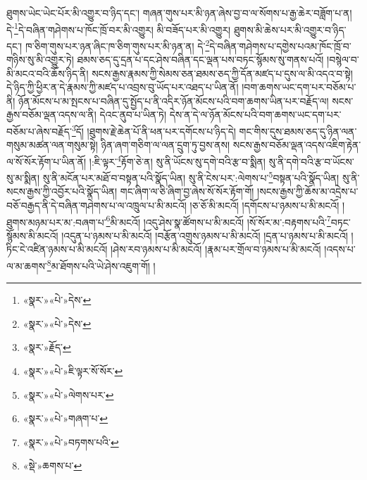 ཐུགས་ཡེང་ཡེང་པོར་མི་འགྱུར་བ་ཉིད་དང་། གཞན་གུས་པར་མི་ཉན་ཞེས་བྱ་བ་ལ་སོགས་པ་རྒྱ་ཆེར་བཟློག་པ་ན། དེ་\footnote{«སྣར་»«པེ་»དེས་}དེ་བཞིན་གཤེགས་པ་ཁོང་ཁྲོ་བར་མི་འགྱུར། མི་བཟོད་པར་མི་འགྱུར། ཐུགས་མི་ཆེས་པར་མི་འགྱུར་བ་ཉིད་དང་། ཁ་ཅིག་གུས་པར་ཉན་ཞིང་ཁ་ཅིག་གུས་པར་མི་ཉན་ན། དེ་\footnote{«སྣར་»«པེ་»དེས་}དེ་བཞིན་གཤེགས་པ་དགྱེས་པའམ་ཁོང་ཁྲོ་བ་གཉིས་སུ་མི་འགྱུར་ཏེ། ཐམས་ཅད་དུ་དྲན་པ་དང་ཤེས་བཞིན་དང་ལྡན་པས་བཏང་སྙོམས་སུ་གནས་པའོ། །བསྙེལ་བ་མི་མངའ་བའི་ཆོས་ཉིད་ནི། སངས་རྒྱས་རྣམས་ཀྱི་སེམས་ཅན་ཐམས་ཅད་ཀྱི་དོན་མཛད་པ་དུས་ལ་མི་འདའ་བ་སྟེ། དེ་ཉིད་ཀྱི་ཕྱིར་ན་དེ་རྣམས་ཀྱི་མཛད་པ་འབྲས་བུ་ཡོད་པར་འཐད་པ་ཡིན་ནོ། །བག་ཆགས་ཡང་དག་པར་བཅོམ་པ་ནི། ཉོན་མོངས་པ་མ་སྤངས་པ་བཞིན་དུ་སྤྱོད་པ་ནི་འདིར་ཉོན་མོངས་པའི་བག་ཆགས་ཡིན་པར་བརྗོད་ལ། སངས་རྒྱས་བཅོམ་ལྡན་འདས་ལ་ནི། དེའང་ནུབ་པ་ཡིན་ཏེ། དེས་ན་དེ་ལ་ཉོན་མོངས་པའི་བག་ཆགས་ཡང་དག་པར་བཅོམ་པ་ཞེས་བརྗོད་\footnote{«སྣར་»རྗོད་}དོ། །ཐུགས་རྗེ་ཆེན་པོ་ནི་ཕན་པར་དགོངས་པ་ཉིད་དེ། གང་གིས་དུས་ཐམས་ཅད་དུ་ཉིན་ལན་གསུམ་མཚན་ལན་གསུམ་སྟེ། ཉིན་ཞག་གཅིག་ལ་ལན་དྲུག་ཏུ་བྱས་ནས། སངས་རྒྱས་བཅོམ་ལྡན་འདས་འཇིག་རྟེན་ལ་སོ་སོར་རྟོག་པ་ཡིན་ནོ། །:ཇི་ལྟར་\footnote{«སྣར་»«པེ་»ཇི་ལྟར་སོ་སོར་}རྟོག་ཅེ་ན། སུ་ནི་ཡོངས་སུ་དགེ་བའི་རྩ་བ་སྨིན། སུ་ནི་དགེ་བའི་རྩ་བ་ཡོངས་སུ་མ་སྨིན། སུ་ནི་མངོན་པར་མཐོ་བ་བསྟན་པའི་སྣོད་ཡིན། སུ་ནི་ངེས་པར་:ལེགས་པ་\footnote{«སྣར་»«པེ་»ལེགས་པར་}བསྟན་པའི་སྣོད་ཡིན། སུ་ནི་སངས་རྒྱས་ཀྱི་འབྱོར་པའི་སྣོད་ཡིན། གང་ཞིག་ལ་ཅི་ཞིག་བྱ་ཞེས་སོ་སོར་རྟོག་གོ། །སངས་རྒྱས་ཀྱི་ཆོས་མ་འདྲེས་པ་བཅོ་བརྒྱད་ནི་དེ་བཞིན་གཤེགས་པ་ལ་འཁྲུལ་པ་མི་མངའོ། །ཅ་ཅོ་མི་མངའོ། །དགོངས་པ་ཉམས་པ་མི་མངའོ། །ཐུགས་མཉམ་པར་མ་:བཞག་པ་\footnote{«སྣར་»«པེ་»གཞག་པ་}མི་མངའོ། །འདུ་ཤེས་སྣ་ཚོགས་པ་མི་མངའོ། །སོ་སོར་མ་:བརྟགས་པའི་\footnote{«སྣར་»«པེ་»བཏགས་པའི་}བཏང་སྙོམས་མི་མངའོ། །འདུན་པ་ཉམས་པ་མི་མངའོ། །བརྩོན་འགྲུས་ཉམས་པ་མི་མངའོ། །དྲན་པ་ཉམས་པ་མི་མངའོ། །ཏིང་ངེ་འཛིན་ཉམས་པ་མི་མངའོ། །ཤེས་རབ་ཉམས་པ་མི་མངའོ། །རྣམ་པར་གྲོལ་བ་ཉམས་པ་མི་མངའོ། །འདས་པ་ལ་མ་ཆགས་\footnote{«སྡེ་»ཆགས་པ་}མ་ཐོགས་པའི་ཡེ་ཤེས་འཇུག་གོ། །

